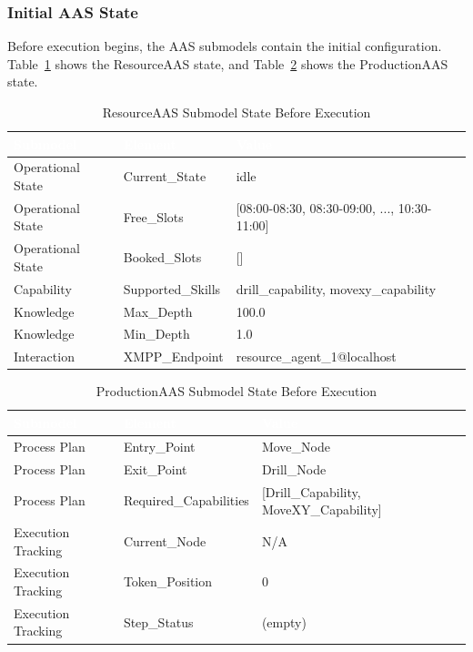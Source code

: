 \subsubsection{Initial AAS State}

Before execution begins, the \ac{AAS} submodels contain the initial configuration. Table~\ref{tab:aas_before} shows the ResourceAAS state, and Table~\ref{tab:production_aas_before} shows the ProductionAAS state.

\begin{table}[ht]
\centering
\caption{ResourceAAS Submodel State Before Execution}
\label{tab:aas_before}
\begin{tabular}{lll}
\toprule
\rowcolor{headerblue}
\textcolor{white}{Submodel} & \textcolor{white}{Element} & \textcolor{white}{Value} \\
\midrule
Operational State & Current\_State & idle \\
Operational State & Free\_Slots & [08:00-08:30, 08:30-09:00, ..., 10:30-11:00] \\
Operational State & Booked\_Slots & [] \\
\rowcolor{lightgray}
Capability & Supported\_Skills & drill\_capability, movexy\_capability \\
\rowcolor{lightgray}
Knowledge & Max\_Depth & 100.0 \\
\rowcolor{lightgray}
Knowledge & Min\_Depth & 1.0 \\
Interaction & XMPP\_Endpoint & resource\_agent\_1@localhost \\
\bottomrule
\end{tabular}
\end{table}

\begin{table}[ht]
\centering
\caption{ProductionAAS Submodel State Before Execution}
\label{tab:production_aas_before}
\begin{tabular}{lll}
\toprule
\rowcolor{headerblue}
\textcolor{white}{Submodel} & \textcolor{white}{Element} & \textcolor{white}{Value} \\
\midrule
Process Plan & Entry\_Point & Move\_Node \\
Process Plan & Exit\_Point & Drill\_Node \\
Process Plan & Required\_Capabilities & [Drill\_Capability, MoveXY\_Capability] \\
\rowcolor{lightgray}
Execution Tracking & Current\_Node & N/A \\
Execution Tracking & Token\_Position & 0 \\
Execution Tracking & Step\_Status & (empty) \\
\bottomrule
\end{tabular}
\end{table}

